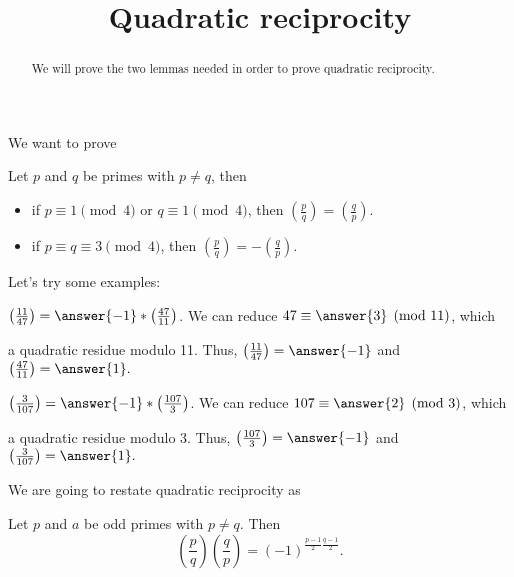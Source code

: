 \documentclass{ximera}
\title{Quadratic reciprocity}
\theoremstyle{definition}
\begin{document}
  
\begin{abstract}  
We will prove the two lemmas needed in order to prove quadratic reciprocity.\end{abstract}  
\maketitle  

We want to prove 
\begin{theorem}
 Let $p$ and $q$ be primes with $p\neq q$, then 
\begin{itemize}
 \item if $p\equiv 1 \pmod 4$ or $q\equiv 1 \pmod 4$, then $\left(\frac{p}{q}\right)=\left(\frac{q}{p}\right)$.
 \item if $p\equiv q \equiv 3 \pmod 4$, then $\left(\frac{p}{q}\right)=-\left(\frac{q}{p}\right)$.
\end{itemize}
\end{theorem}

Let's try some examples: 
\begin{question}
 $\left(\frac{11}{47}\right)=\answer{-1}
* \left(\frac{47}{11}\right)$. We can reduce $47\equiv\answer{3}
 \pmod{11}$, which 
\begin{multipleChoice}
\end{multipleChoice}
a quadratic residue modulo 11. Thus,  $\left(\frac{11}{47}\right)=\answer{-1}
$ and $ \left(\frac{47}{11}\right)=\answer{1}
.$ 
\end{question}

\begin{question}
 $\left(\frac{3}{107}\right)=\answer{-1}
* \left(\frac{107}{3}\right)$. We can reduce $107\equiv\answer{2}
 \pmod{3}$, which 
\begin{multipleChoice}
\end{multipleChoice}
a quadratic residue modulo 3. Thus,  $\left(\frac{107}{3}\right)=\answer{-1}
$ and $ \left(\frac{3}{107}\right)=\answer{1}
.$ 
\end{question}

We are going to restate quadratic reciprocity as
\begin{theorem}
 Let $p$ and $a$ be odd primes with $p\neq q$. Then \[\left(\frac{p}{q}\right)\left(\frac{q}{p}\right)=(-1)^{\frac{p-1}{2}\frac{q-1}{2}}.\]
\end{theorem}
\end{document}
